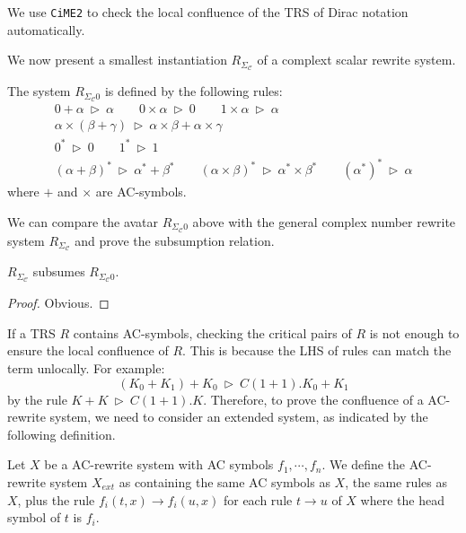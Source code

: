 \documentclass[manuscript, review, timestamp]{acmart}
\newcommand*{\reduce}{\ \triangleright\ }
\begin{document}
We use \texttt{CiME2} to check the local confluence of the TRS of Dirac notation automatically.

We now present a smallest instantiation $R_{\Sigma_\mathcal{C}}$ of a complext scalar rewrite system. 

\begin{definition}
  The system $R_{\Sigma_\mathcal{C}0}$ is defined by the following rules:
  \begin{gather*}
    0 + \alpha \reduce \alpha
    \qquad
    0 \times \alpha \reduce 0
    \qquad
    1 \times \alpha \reduce \alpha \\
    \alpha \times (\beta + \gamma) \reduce \alpha \times \beta + \alpha \times \gamma \\
    0^* \reduce 0
    \qquad
    1^* \reduce 1 \\
    (\alpha + \beta)^* \reduce \alpha^* + \beta^*
    \qquad
    (\alpha \times \beta)^* \reduce \alpha^* \times \beta^*
    \qquad
    (\alpha^*)^* \reduce \alpha
  \end{gather*}
  where $+$ and $\times$ are AC-symbols.
\end{definition}

We can compare the avatar $R_{\Sigma_\mathcal{C}0}$ above with the general complex number rewrite system $R_{\Sigma_\mathcal{C}}$ and prove the subsumption relation.

\begin{proposition}
  $R_{\Sigma_\mathcal{C}}$ subsumes $R_{\Sigma_\mathcal{C}0}$.
\end{proposition}

\begin{proof}
  Obvious.
\end{proof}


If a TRS $R$ contains AC-symbols, checking the critical pairs of $R$ is not enough to ensure the local confluence of $R$. This is because the LHS of rules can match the term unlocally. For example:
$$
(K_0 + K_1) + K_0 \reduce C(1 + 1).K_0 + K_1
$$
by the rule $ K + K \reduce C(1 + 1).K$. Therefore, to prove the confluence of a AC-rewrite system, we need to consider an extended system, as indicated by the following definition.

\begin{definition}
  Let $X$ be a AC-rewrite system with AC symbols $f_1, \cdots, f_n$. We define the AC-rewrite system $X_{ext}$ as containing the same AC symbols as $X$, the same rules as $X$, plus the rule $f_i(t, x) \to f_i(u, x)$ for each rule $t \to u$ of $X$ where the head symbol of $t$ is $f_i$.
\end{definition}
\end{document}
